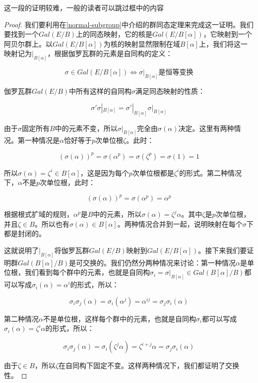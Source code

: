 \documentclass[b5paper]{ctexart}
\begin{document}
\begin{mdframed}
这一段的证明较难，一般的读者可以跳过框中的内容
\begin{proof}
我们要利用在\ref{normal-subgroup}中介绍的群同态定理来完成这一证明。我们要找到一个$Gal(E/B)$上的同态映射，它的核是$Gal(E/B[\alpha])$，它映射到一个阿贝尔群上。以$Gal(E/B[\alpha])$为核的映射显然限制在域$B[\alpha]$上，我们将这一映射记为$|_{B[\alpha]}$，根据伽罗瓦群的元素是自同构的定义：

\[
\sigma \in Gal(E/B[\alpha]) \iff \sigma|_{B[\alpha]} \text{是恒等变换}
\]

伽罗瓦群$Gal(E/B)$中所有这样的自同构$\sigma$满足同态映射的性质：

\[
\sigma'\sigma|_{B[\alpha]} = \sigma'|_{B[\alpha]}\sigma|_{B[\alpha]}
\]

由于$\sigma$固定所有$B$中的元素不变，所以$\sigma|_{B[\alpha]}$完全由$\sigma(\alpha)$决定。这里有两种情况。第一种情况是$\alpha$恰好等于$p$次单位根$\zeta$。此时：

\[
(\sigma(\alpha))^p = \sigma(\alpha^p) = \sigma(\zeta^p) = \sigma(1) = 1
\]

所以$\sigma(\alpha) = \zeta^i \in B[\alpha]$，这是因为每个$p$次单位根都是$\zeta^i$的形式。第二种情况下，$\alpha$不是$p$次单位根，此时：

\[
(\sigma(\alpha))^p = \sigma(\alpha^p) = \alpha^p
\]

根据根式扩域的规则，$\alpha^p$是$B$中的元素，所以$\sigma(\alpha) = \zeta^j\alpha$。其中$\zeta$是$p$次单位根，并且$\zeta \in B$。所以也有$\sigma(\alpha) \in B[\alpha]$。两种情况合并到一起，说明映射在每个$\sigma$下都是封闭的。

这就说明了$|_{B[\alpha]}$将伽罗瓦群$Gal(E/B)$映射到$Gal(E/B[\alpha])$。接下来我们要证明群$Gal(B[\alpha]/B)$是可交换的。我们仍然分两种情况来讨论：第一种情况$\alpha$是单位根，我们看到每个群中的元素，也就是自同构$\sigma_i = \sigma|_{B[\alpha]} \in Gal(B[\alpha]/B)$都可以写成$\sigma_i(\alpha) = \alpha^i$的形式，所以：

\[
\sigma_i\sigma_j(\alpha) = \sigma_i(\alpha^j) = \alpha^{ij} = \sigma_j\sigma_i(\alpha)
\]

第二种情况$\alpha$不是单位根，这样每个群中的元素，也就是自同构$\sigma_i$都可以写成$\sigma_i(\alpha) = \zeta^i\alpha$的形式，所以：

\[
\sigma_i\sigma_j(\alpha) = \sigma_i(\zeta^j\alpha) = \zeta^{i + j}\alpha = \sigma_j\sigma_i(\alpha)
\]

由于$\zeta \in B$，所以$\zeta$在自同构下固定不变。这样两种情况下，我们都证明了交换性。
\end{proof}
\end{mdframed}
\end{document}
